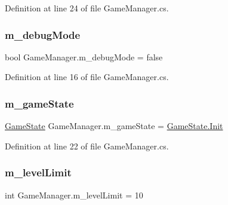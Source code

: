 Definition at line 24 of file Game\+Manager.\+cs.

\mbox{\label{class_game_manager_a7aed1c66e288d6712e7b04c12bd0d5cc}} 
\subsubsection{\texorpdfstring{m\+\_\+debug\+Mode}{m\_debugMode}}
{\footnotesize\ttfamily bool Game\+Manager.\+m\+\_\+debug\+Mode = false\hspace{0.3cm}{\ttfamily [private]}}



Definition at line 16 of file Game\+Manager.\+cs.

\mbox{\label{class_game_manager_a17e003b42eb6c99308a04813e359ff71}} 
\subsubsection{\texorpdfstring{m\+\_\+game\+State}{m\_gameState}}
{\footnotesize\ttfamily \mbox{\hyperlink{_game_manager_8cs_a7899b65f1ea0f655e4bbf8d2a5714285}{Game\+State}} Game\+Manager.\+m\+\_\+game\+State = \mbox{\hyperlink{_game_manager_8cs_a7899b65f1ea0f655e4bbf8d2a5714285a95b19f7739b0b7ea7d6b07586be54f36}{Game\+State.\+Init}}\hspace{0.3cm}{\ttfamily [private]}}



Definition at line 22 of file Game\+Manager.\+cs.

\mbox{\label{class_game_manager_a8166d596fca625618a2b5ab261b07659}} 
\subsubsection{\texorpdfstring{m\+\_\+level\+Limit}{m\_levelLimit}}
{\footnotesize\ttfamily int Game\+Manager.\+m\+\_\+level\+Limit = 10\hspace{0.3cm}{\ttfamily [private]}}



